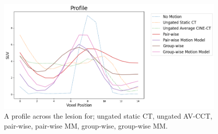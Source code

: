 \documentclass[misc, color=UCLburgundy, margin=1cm]{uclposter}
\begin{document}
\begin{multicols}{4}
            \begin{figure}[H]
                \centering
                \includegraphics[width=0.9\linewidth]{profile.png}
                \begin{highlightbox}[UCLlightblue]
                    \captionsetup{singlelinecheck=false, justification=centering}
                    \caption{A profile across the lesion for; ungated static \gls{CT}, ungated \gls{AV-CCT}, pair-wise, pair-wise \gls{MM}, group-wise, group-wise \gls{MM}.}
                \end{highlightbox}
            \end{figure}
            

\end{multicols}
\end{document}
